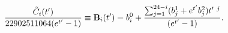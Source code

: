 \begin{equation}
\label{PFdiffeq2}
{\tilde{C}_i(t^\prime)\over{22902511064(e^{t^\prime}-1)}}\equiv 
{\bf B}_i(t^\prime) = b^0_i+{\sum_{j=1}^{24-i}(b^1_j
+e^{t^\prime}b^2_j)t^\prime\ ^j\over(e^{t^\prime}-1)}.
\end{equation}

